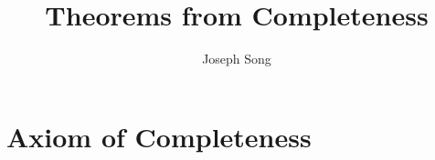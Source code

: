\documentclass{article}
\title{Theorems from Completeness}
\author{Joseph Song}
\date{}
\begin{document}
\maketitle

\section{Axiom of Completeness}
\begin{definition}

    
\end{definition}
\end{document}
